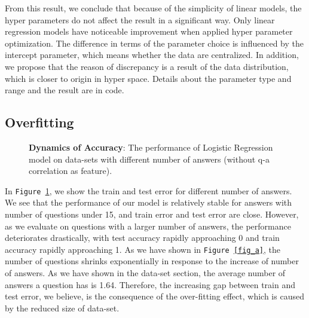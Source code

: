 \documentclass[11pt]{article}
\begin{document}
From this result, we conclude that because of the simplicity of linear models, the hyper parameters do not affect the result in a significant way. Only linear regression models have noticeable improvement when applied hyper parameter optimization. The difference in terms of the parameter choice is influenced by the intercept parameter, which means whether the data are centralized. In addition, we propose that the reason of discrepancy is a result of the data distribution, which is closer to origin in hyper space.
Details about the parameter type and range and the result are in code. 

\subsection{Overfitting}
\begin{figure}[t]

\caption{\textbf{Dynamics of Accuracy}: The performance  of Logistic Regression model on data-sets with different number of answers (without q-a correlation as feature). }
\label{fig_acc}
\end{figure}
In \texttt{Figure \ref{fig_acc}}, we show the train and test error for different number of answers. We see that the performance of our model is relatively stable for answers with number of questions under 15, and train error and test error are close. However, as we evaluate on questions with a larger number of answers, the performance deteriorates drastically, with test accuracy rapidly approaching 0 and train accuracy rapidly approaching 1. As we have shown in \texttt{Figure \ref{fig_a}}, the number of questions shrinks exponentially in  response to the increase of number of answers. As we have shown in the data-set section, the average number of answers a question has is 1.64.   Therefore, the increasing gap between train and test error, we believe, is the consequence of the over-fitting effect, which is caused by the reduced size of data-set.
\end{document}
